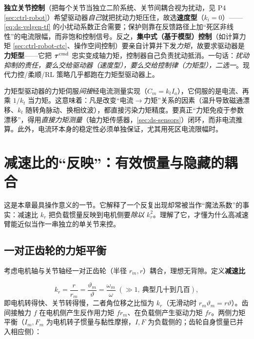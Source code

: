 \begin{insight}
\label{ins:ds-vel-vs-torque}
\textbf{独立关节控制}（把每个关节当独立二阶系统、关节间耦合视为扰动，见 P4 \cref{sec:ctrl-robot}）希望驱动器\emph{自己}就把扰动力矩压住，故选\textbf{速度型}（$k_i=0$）——\cref{eq:ds-velgen-tf} 的小扰动系数正合需要；保护则靠在反馈路径上加“死区非线性”的电流限幅，而非饱和控制信号。反之，\textbf{集中式（基于模型）控制}（如计算力矩 \cref{sec:ctrl-robot-ctc}、操作空间控制）要亲自计算并下发\emph{力矩}，故要求驱动器是\textbf{力矩型}——它把 $\boldsymbol{\tau}^{\rm cmd}$ 忠实变成轴力矩，控制器自己负责扰动抵消。一句话：\emph{扰动抑制的责任，要么交给驱动器（速度型），要么交给控制律（力矩型），二选一}。现代力控/柔顺/RL 策略几乎都跑在力矩型驱动器上。
\end{insight}

\begin{pitfall}
力矩型驱动器的力矩伺服\emph{间接}经电流测量实现（$C_m=k_tI_a$），它伺服的是电流、再乘 $1/k_t$ 当力矩。这意味着：凡是改变“电流$\to$力矩”关系的因素（温升导致磁通漂移、$k_t$ 随转角脉动、换相纹波），都直接污染力矩精度。要真正“力矩免疫于参数漂移”，得用\emph{直接力矩测量}（轴力矩传感器，\cref{sec:ds-sensors}）闭环，而非电流推算。此外，电流环本身的稳定性必须单独保证，尤其用死区电流限幅时。
\end{pitfall}

\section{减速比的“反映”：有效惯量与隐藏的耦合}
\label{sec:ds-gear}

这是本章最具操作意义的一节。它解释了一个反复出现却常被当作“魔法系数”的事实：减速比 $k_r$ 把负载惯量反映到电机侧要\emph{除以 $k_r^2$}。理解了它，才懂为什么高减速臂能近似当作一串独立的单关节来控。

\subsection{一对正齿轮的力矩平衡}
\label{sec:ds-gearmesh}

考虑电机轴与关节轴经一对正齿轮（半径 $r_m,r$）耦合，理想无背隙。定义\textbf{减速比}

\begin{equation}
k_r=\frac{r}{r_m}=\frac{\vartheta_m}{\vartheta}=\frac{\omega_m}{\omega}\;(\gg 1,\ \text{典型几十到几百}),
\label{eq:ds-ratio}
\end{equation}
即电机转得快、关节转得慢，二者角位移之比恒为 $k_r$（无滑动时 $r_m\vartheta_m=r\vartheta$）。齿间接触力 $f$ 在电机侧产生反作用力矩 $f r_m$、在负载侧产生驱动力矩 $f r$。两侧力矩平衡（$I_m,F_m$ 为电机转子惯量与黏性摩擦，$I,F$ 为负载侧的；齿轮自身惯量已并入相应侧）：

